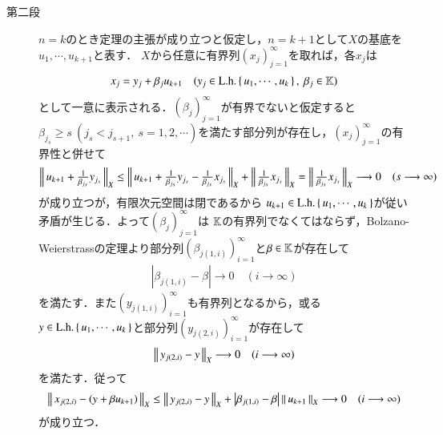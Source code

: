\begin{prf}
\begin{description}
		\item[第二段]
			$n=k$のとき定理の主張が成り立つと仮定し，$n = k+1$として$X$の基底を$u_1,\cdots,u_{k+1}$と表す．
			$X$から任意に有界列$(x_j)_{j=1}^{\infty}$を取れば，各$x_j$は
			\begin{align}
				x_j = y_j + \beta_j u_{k+1} \quad (y_j \in \mathrm{L.h.} \left\{\, u_1,\cdots,u_k\, \right\},\ \beta_j \in \mathbb{K})
			\end{align}
			として一意に表示される．$(\beta_j)_{j=1}^{\infty}$が有界でないと仮定すると
			$\beta_{j_s} \geq s\ (j_s < j_{s+1},\ s=1,2,\cdots)$を満たす部分列が存在し，$(x_j)_{j=1}^{\infty}$の有界性と併せて
			\begin{align}
				\left\|\, u_{k+1} + \tfrac{1}{\beta_{j_s}}y_{j_s}\, \right\|_{X}
				\leq \left\|\, u_{k+1} + \tfrac{1}{\beta_{j_s}}y_{j_s} - \tfrac{1}{\beta_{j_s}}x_{j_s}\, \right\|_{X}
					+ \left\|\, \tfrac{1}{\beta_{j_s}}x_{j_s}\, \right\|_{X}
				= \left\|\, \tfrac{1}{\beta_{j_s}}x_{j_s}\, \right\|_{X} \longrightarrow 0 \quad (s \longrightarrow \infty)
			\end{align}
			が成り立つが，有限次元空間は閉であるから
			$u_{k+1} \in \mathrm{L.h.} \left\{\, u_1,\cdots,u_k\, \right\}$が従い矛盾が生じる．よって$(\beta_j)_{j=1}^{\infty}$は
			$\mathbb{K}$の有界列でなくてはならず，Bolzano-Weierstrassの定理より部分列$\left( \beta_{j(1,i)} \right)_{i=1}^{\infty}$と$\beta \in \mathbb{K}$が存在して
			\begin{align}
				\left| \beta_{j(1,i)} - \beta \right| \longrightarrow 0 \quad (i \longrightarrow \infty)
			\end{align}
			を満たす．また$\left(y_{j(1,i)}\right)_{i=1}^{\infty}$も有界列となるから，或る
			$y \in \mathrm{L.h.} \left\{\, u_1,\cdots,u_k\, \right\}$と部分列$\left(y_{j(2,i)}\right)_{i=1}^{\infty}$が存在して
			\begin{align}
				\left\|\, y_{j(2,i)} - y\, \right\|_{X} \longrightarrow 0 \quad (i \longrightarrow \infty)
			\end{align}
			を満たす．従って
			\begin{align}
				\left\|\, x_{j(2,i)} - \left(y + \beta u_{k+1}\right)\, \right\|_{X} \leq
				\left\|\, y_{j(2,i)} - y\, \right\|_{X} + \left| \beta_{j(1,i)} - \beta \right| \left\|\, u_{k+1}\, \right\|_{X}
				\longrightarrow 0 \quad (i \longrightarrow \infty)
			\end{align}
			が成り立つ．
	\end{description}
	\QED
\end{prf}